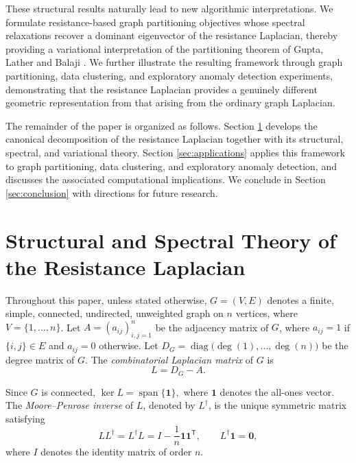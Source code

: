 \documentclass[12pt,a4paper]{amsart}
\theoremstyle{remark}
\theoremstyle{definition}
\newcommand{\1}{\mathbf{1}}
\newcommand{\0}{\mathbf{0}}
\begin{document}
These structural results naturally lead to new algorithmic interpretations. 
We formulate resistance-based graph partitioning objectives whose spectral relaxations recover a dominant eigenvector of the resistance Laplacian, thereby providing a variational interpretation of the partitioning theorem of Gupta, Lather and Balaji \cite{gupta}. 
We further illustrate the resulting framework through graph partitioning, data clustering, and exploratory anomaly detection experiments, demonstrating that the resistance Laplacian provides a genuinely different geometric representation from that arising from the ordinary graph Laplacian.

The remainder of the paper is organized as follows. Section \ref{sec:spectral} develops the canonical decomposition of the resistance Laplacian together with its structural, spectral, and variational theory. 
Section \ref{sec:applications} applies this framework to graph partitioning, data clustering, and exploratory anomaly detection, and discusses the associated computational implications. 
We conclude in Section \ref{sec:conclusion} with directions for future research.






\section{Structural and Spectral Theory of the Resistance Laplacian}\label{sec:spectral}


Throughout this paper, unless stated otherwise, $G=(V,E)$ denotes a
finite, simple, connected, undirected, unweighted graph on $n$
vertices, where $V=\{1,\ldots,n\}$. Let $A=(a_{ij})_{i,j=1}^{n}$ be the adjacency matrix of $G$, where $a_{ij}=1$ if
$\{i,j\}\in E$ and $a_{ij}=0$ otherwise. Let $D_G=\operatorname{diag}\bigl(\deg(1),\ldots,\deg(n)\bigr)$ be the degree matrix of $G$. The \emph{combinatorial Laplacian matrix}
of $G$ is
\[
L=D_G-A.
\]

Since $G$ is connected, $\ker L=\operatorname{span}\{\mathbf{1}\},$ where $\mathbf{1}$ denotes the all-ones vector. The
\emph{Moore--Penrose inverse} of $L$, denoted by $L^\dagger$, is the
unique symmetric matrix satisfying
\[
LL^\dagger=L^\dagger L
=
I-\frac{1}{n}\mathbf{1}\mathbf{1}^{\mathsf T},
\qquad
L^\dagger\mathbf{1}=\mathbf{0},
\]
where $I$ denotes the identity matrix of order $n$.
\end{document}
